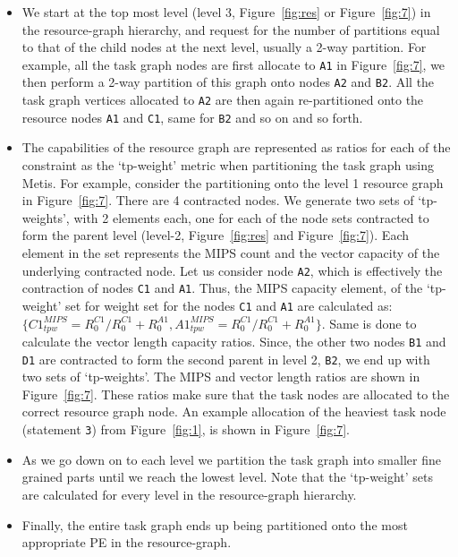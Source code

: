 \begin{itemize}

\item We start at the top most level (level 3, Figure~\ref{fig:res} or
  Figure~\ref{fig:7}) in the resource-graph hierarchy, and request for
  the number of partitions equal to that of the child nodes at the next
  level, usually a 2-way partition. For example, all the task graph
  nodes are first allocate to \texttt{A1} in Figure~\ref{fig:7}, we then
  perform a 2-way partition of this graph onto nodes \texttt{A2} and
  \texttt{B2}. All the task graph vertices allocated to \texttt{A2} are
  then again re-partitioned onto the resource nodes \texttt{A1} and
  \texttt{C1}, same for \texttt{B2} and so on and so forth.

\item The capabilities of the resource graph are represented as ratios
  for each of the constraint as the `tp-weight' metric when partitioning
  the task graph using Metis. For example, consider the partitioning
  onto the level 1 resource graph in Figure~\ref{fig:7}. There are 4
  contracted nodes. We generate two sets of `tp-weights', with 2
  elements each, one for each of the node sets contracted to form the
  parent level (level-2, Figure~\ref{fig:res} and
  Figure~\ref{fig:7}). Each element in the set represents the MIPS count
  and the vector capacity of the underlying contracted node. Let us
  consider node \texttt{A2}, which is effectively the contraction of
  nodes \texttt{C1} and \texttt{A1}. Thus, the MIPS capacity element, of
  the `tp-weight' set for weight set for the nodes \texttt{C1} and
  \texttt{A1} are calculated as: {$\{C1^{MIPS}_{tpw} = R^{C1}_0/R^{C1}_0
    + R^{A1}_0, A1^{MIPS}_{tpw} = R^{C1}_0/R^{C1}_0 + R^{A1}_0\}$}. Same
  is done to calculate the vector length capacity ratios. Since, the
  other two nodes \texttt{B1} and \texttt{D1} are contracted to form the
  second parent in level 2, \texttt{B2}, we end up with two sets of
  `tp-weights'. The MIPS and vector length ratios are shown in
  Figure~\ref{fig:7}. These ratios make sure that the task nodes are
  allocated to the correct resource graph node. An example allocation of
  the heaviest task node (statement \texttt{3}) from Figure~\ref{fig:1},
  is shown in Figure~\ref{fig:7}.

\item As we go down on to each level we partition the task graph into
  smaller fine grained parts until we reach the lowest level. Note that
  the `tp-weight' sets are calculated for every level in the
  resource-graph hierarchy.

\item Finally, the entire task graph ends up being partitioned onto the
  most appropriate PE in the resource-graph.

\end{itemize}


